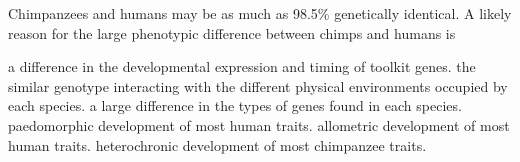 \question
Chimpanzees and humans may be as much as 98.5\% genetically identical.  A likely reason for the large phenotypic difference between chimps and humans is

\begin{choices}
\correctchoice a difference in the developmental expression and timing of toolkit genes. %
\choice the similar genotype interacting with the different physical environments occupied by each species. %
\choice a large difference in the types of genes found in each species. %
\choice paedomorphic development of most human traits. %
\choice allometric development of most human traits. %
\choice heterochronic development of most chimpanzee traits. %
\end{choices}

